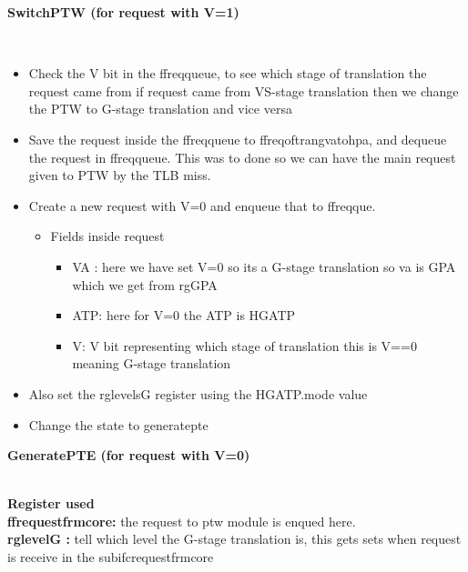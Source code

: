 \documentclass{article}
\newcommand{\resheading}[1]{{\small \colorbox{mygrey}{\begin{minipage}{0.975\textwidth}{\textbf{#1 \vphantom{p\^{E}}}}\end{minipage}}}}
\begin{document}
\resheading{\textbf{SwitchPTW  (for request with V=1)}}\\  

\begin{itemize}
\item Check the V bit in the ff\textunderscore req\textunderscore queue, to see which stage of translation the request came from if request came from VS-stage translation then we change the PTW to G-stage translation and vice versa 
\item Save the request inside the ff\textunderscore req\textunderscore queue to ff\textunderscore req\textunderscore of\textunderscore tran\textunderscore gva\textunderscore to\textunderscore hpa, and dequeue the request in ff\textunderscore req\textunderscore queue. This was to done so we can have the main request given to PTW by the TLB miss. 
\item Create a new request with V=0 and enqueue that to ff\textunderscore req\textunderscore que.
\begin{itemize}
\item Fields inside request
\begin{itemize}

\item VA : here we have set V=0 so its a G-stage translation so va is GPA which we get from rg\textunderscore GPA
\item ATP: here for V=0 the ATP is HGATP
\item V: V bit representing which stage of translation this is V==0 meaning G-stage translation 

\end{itemize}
\end{itemize}

\item Also set the rg\textunderscore levels\textunderscore G register using the HGATP.mode value
\item Change the state to generate\textunderscore pte

\end{itemize}

\resheading{\textbf{GeneratePTE  (for request with V=0)}}\\ 

\textbf{Register used} \\

\textbf{ff\textunderscore request\textunderscore frm\textunderscore core:} the request to ptw module is enqued here.\\

\textbf{rg\textunderscore level\textunderscore G :} tell which level the G-stage translation is, this gets sets when request is receive in the subifc\textunderscore request\textunderscore frm\textunderscore core\\
\end{document}
